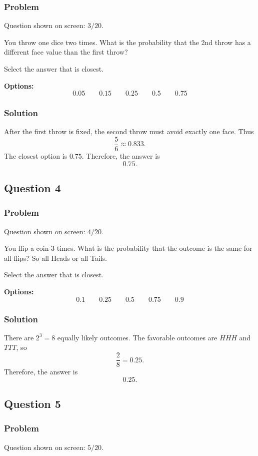 \documentclass[12pt]{article}
\begin{document}
\subsubsection{Problem}
Question shown on screen: \(3/20\).

You throw one dice two times. What is the probability that the 2nd throw has a different face value than the first throw?

Select the answer that is closest.

\noindent\textbf{Options:}
\[
\boxed{0.05}
\qquad
\boxed{0.15}
\qquad
\boxed{0.25}
\qquad
\boxed{0.5}
\qquad
\boxed{0.75}
\]

\subsubsection{Solution}
After the first throw is fixed, the second throw must avoid exactly one face. Thus
\[
\frac{5}{6}\approx 0.833.
\]
The closest option is \(0.75\). Therefore, the answer is
\[
\boxed{0.75}.
\]

\subsection{Question 4}
\subsubsection{Problem}
Question shown on screen: \(4/20\).

You flip a coin 3 times. What is the probability that the outcome is the same for all flips? So all Heads or all Tails.

Select the answer that is closest.

\noindent\textbf{Options:}
\[
\boxed{0.1}
\qquad
\boxed{0.25}
\qquad
\boxed{0.5}
\qquad
\boxed{0.75}
\qquad
\boxed{0.9}
\]

\subsubsection{Solution}
There are \(2^3=8\) equally likely outcomes. The favorable outcomes are \(HHH\) and \(TTT\), so
\[
\frac{2}{8}=0.25.
\]
Therefore, the answer is
\[
\boxed{0.25}.
\]

\subsection{Question 5}
\subsubsection{Problem}
Question shown on screen: \(5/20\).
\end{document}
